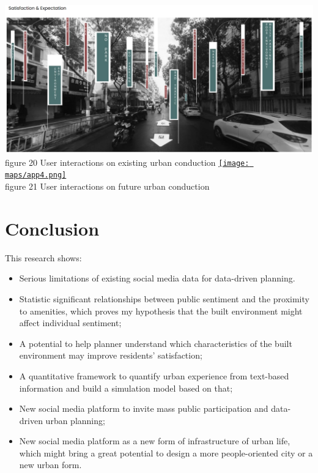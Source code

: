 \documentclass[
]{article}
\providecommand{\tightlist}{%
  \setlength{\itemsep}{0pt}\setlength{\parskip}{0pt}}
\begin{document}
\href{https://WTHSYZW.github.io/Thesis_2022/maps/app3.png}{\includegraphics{maps/app3.png}}\\
figure 20 User interactions on existing urban conduction
\href{https://WTHSYZW.github.io/Thesis_2022/maps/app4.png}{\texttt{[image: maps/app4.png]}}\\
figure 21 User interactions on future urban conduction

\hypertarget{conclusion}{%
\section{Conclusion}\label{conclusion}}

This research shows:

\begin{itemize}
\tightlist
\item
  Serious limitations of existing social media data for data-driven
  planning.\\
\item
  Statistic significant relationships between public sentiment and the
  proximity to amenities, which proves my hypothesis that the built
  environment might affect individual sentiment;\\
\item
  A potential to help planner understand which characteristics of the
  built environment may improve residents' satisfaction;\\
\item
  A quantitative framework to quantify urban experience from text-based
  information and build a simulation model based on that;\\
\item
  New social media platform to invite mass public participation and
  data-driven urban planning;\\
\item
  New social media platform as a new form of infrastructure of urban
  life, which might bring a great potential to design a more
  people-oriented city or a new urban form.
\end{itemize}
\end{document}
